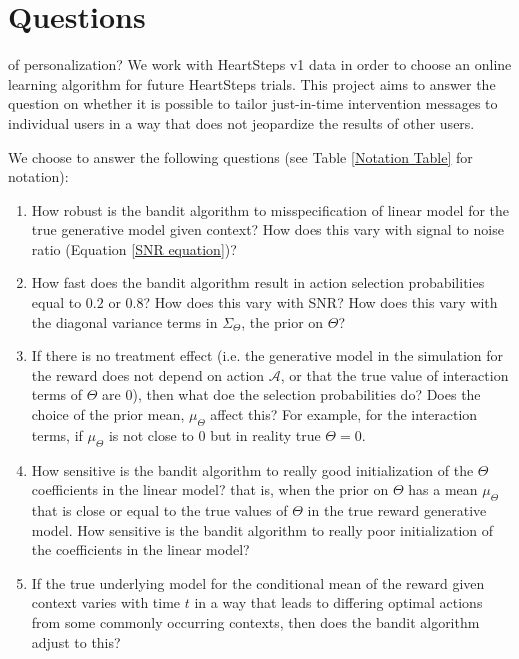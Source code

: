 
\chapter{Questions}
\label{Qustions}

 of personalization?  We work with HeartSteps v1 data in order to choose an online learning algorithm for future HeartSteps trials.  This project aims to answer the question on whether it is possible to tailor just-in-time intervention messages to individual users in a way that does not jeopardize the results of other users.

We choose to answer the following questions (see Table \ref{Notation Table} for notation):

\begin{enumerate}
	\item How robust is the bandit algorithm to misspecification of linear model for the true generative model given context?  How does this vary with signal to noise ratio (Equation \ref{SNR equation})?
	\item How fast does the bandit algorithm result in action selection probabilities equal to $0.2$ or $0.8$?  How does this vary with SNR?  How does this vary with the diagonal variance terms in $\Sigma_\Theta$, the prior on $\Theta$?
	\item If there is no treatment effect (i.e. the generative model in the simulation for the reward does not depend on action $\mathcal{A}$, or that the true value of interaction terms of $\Theta$ are $0$), then what doe the selection probabilities do?  Does the choice of the prior mean, $\mu_\Theta$ affect this?  For example, for the interaction terms, if $\mu_\Theta$ is not close to $0$ but in reality true $\Theta = 0$.
	\item How sensitive is the bandit algorithm to really good initialization of the $\Theta$ coefficients in the linear model?  that is, when the prior on $\Theta$ has a mean $\mu_\Theta$ that is close or equal to the true values of $\Theta$ in the true reward generative model.  How sensitive is the bandit algorithm to really poor initialization of the coefficients in the linear model?
	\item If the true underlying model for the conditional mean of the reward given context varies with time $t$ in a way that leads to differing optimal actions from some commonly occurring contexts, then does the bandit algorithm adjust to this?
\end{enumerate}

